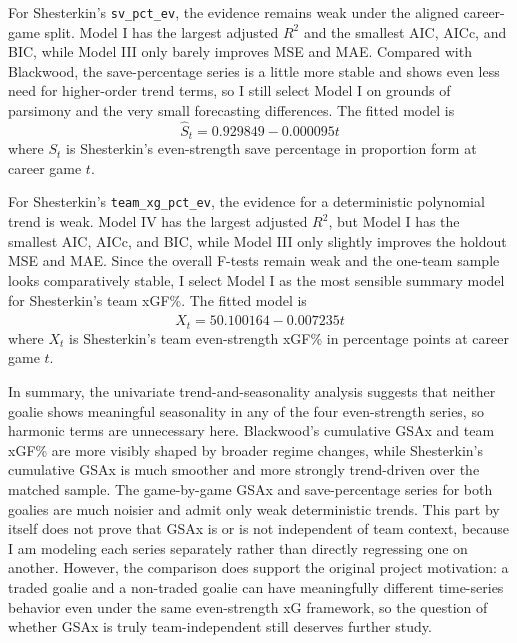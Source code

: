 \documentclass[
  10pt,
]{extarticle}
\begin{document}
For Shesterkin's \texttt{sv\_pct\_ev}, the evidence remains weak under the aligned career-game split. Model I has the largest adjusted \(R^2\) and the smallest AIC, AICc, and BIC, while Model III only barely improves MSE and MAE. Compared with Blackwood, the save-percentage series is a little more stable and shows even less need for higher-order trend terms, so I still select Model I on grounds of parsimony and the very small forecasting differences. The fitted model is
\[
\widehat{S}_t = 0.929849 - 0.000095 t
\]
where \(S_t\) is Shesterkin's even-strength save percentage in proportion form at career game \(t\).

For Shesterkin's \texttt{team\_xg\_pct\_ev}, the evidence for a deterministic polynomial trend is weak. Model IV has the largest adjusted \(R^2\), but Model I has the smallest AIC, AICc, and BIC, while Model III only slightly improves the holdout MSE and MAE. Since the overall F-tests remain weak and the one-team sample looks comparatively stable, I select Model I as the most sensible summary model for Shesterkin's team xGF\%. The fitted model is
\[
\widehat{X}_t = 50.100164 - 0.007235 t
\]
where \(X_t\) is Shesterkin's team even-strength xGF\% in percentage points at career game \(t\).

In summary, the univariate trend-and-seasonality analysis suggests that neither goalie shows meaningful seasonality in any of the four even-strength series, so harmonic terms are unnecessary here. Blackwood's cumulative GSAx and team xGF\% are more visibly shaped by broader regime changes, while Shesterkin's cumulative GSAx is much smoother and more strongly trend-driven over the matched sample. The game-by-game GSAx and save-percentage series for both goalies are much noisier and admit only weak deterministic trends. This part by itself does not prove that GSAx is or is not independent of team context, because I am modeling each series separately rather than directly regressing one on another. However, the comparison does support the original project motivation: a traded goalie and a non-traded goalie can have meaningfully different time-series behavior even under the same even-strength xG framework, so the question of whether GSAx is truly team-independent still deserves further study.
\end{document}
